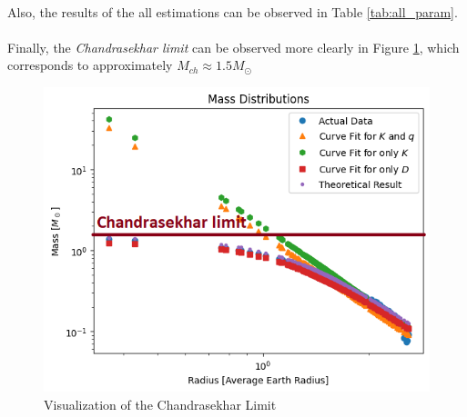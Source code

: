 \documentclass[letterpaper,12pt]{article}
\begin{document}
\paragraph{} Also, the results of the all estimations can be observed in Table \ref{tab:all_param}.

\begin{table}[H]
    \centering
    \caption{Overall Estimated Parameter Set}
    \label{tab:all_param}
    \end{table}

\paragraph{} Finally, the \textit{Chandrasekhar limit} can be observed more clearly in Figure \ref{fig:chandrasekhar}, which corresponds to approximately $M_{ch} \approx 1.5 M_\odot$

\begin{figure}[H] 
   \centering \includegraphics[width=0.7\columnwidth]{figures/7_n_ll_ms_r_chandrasekhar.png}           
                \caption{Visualization of the Chandrasekhar Limit}                
                   \label{fig:chandrasekhar}
   \end{figure}
\end{document}
